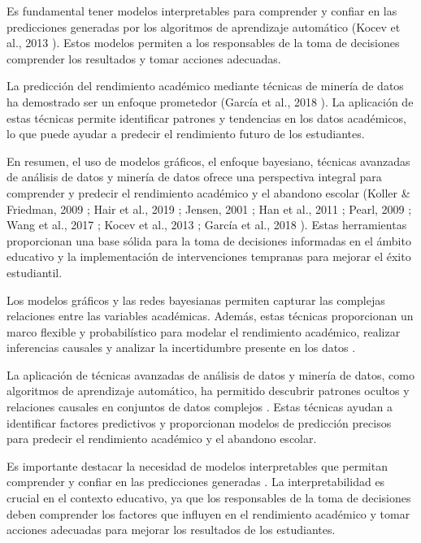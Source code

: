 Es fundamental tener modelos interpretables para comprender y confiar en las predicciones generadas por los algoritmos de aprendizaje automático
(Kocev et al., 2013 \cite{kocev2013need}). Estos modelos permiten a los responsables de la toma de decisiones comprender los resultados y tomar
acciones adecuadas.

La predicción del rendimiento académico mediante técnicas de minería de datos ha demostrado ser un enfoque prometedor
(García et al., 2018 \cite{garcia2018prediccion}). La aplicación de estas técnicas permite identificar patrones y tendencias en los datos académicos,
lo que puede ayudar a predecir el rendimiento futuro de los estudiantes.

En resumen, el uso de modelos gráficos, el enfoque bayesiano, técnicas avanzadas de análisis de datos y minería de datos ofrece una perspectiva integral para
comprender y predecir el rendimiento académico y el abandono escolar (Koller \& Friedman, 2009 \cite{koller2009introduction};
Hair et al., 2019 \cite{hair2019advanced}; Jensen, 2001 \cite{jensen2001bayesian}; Han et al., 2011 \cite{han2011data}; Pearl, 2009 \cite{pearl2009introduction};
Wang et al., 2017 \cite{wang2017literature}; Kocev et al., 2013 \cite{kocev2013need}; García et al., 2018 \cite{garcia2018prediccion}).
Estas herramientas proporcionan una base sólida para la toma de decisiones informadas en el ámbito educativo y la implementación de intervenciones tempranas
para mejorar el éxito estudiantil.

Los modelos gráficos y las redes bayesianas permiten capturar las complejas relaciones entre las variables académicas. Además, 
estas técnicas proporcionan un marco flexible y probabilístico para modelar el rendimiento académico, realizar inferencias causales y 
analizar la incertidumbre presente en los datos \cite{jensen2001bayesian}.

La aplicación de técnicas avanzadas de análisis de datos y minería de datos, como algoritmos de aprendizaje automático, ha permitido descubrir patrones ocultos
y relaciones causales en conjuntos de datos complejos \cite{hair2019advanced, han2011data}. Estas técnicas ayudan a identificar factores predictivos y
proporcionan modelos de predicción precisos para predecir el rendimiento académico y el abandono escolar.

Es importante destacar la necesidad de modelos interpretables que permitan comprender y confiar en las predicciones generadas \cite{kocev2013need}.
La interpretabilidad es crucial en el contexto educativo, ya que los responsables de la toma de decisiones deben comprender los factores que influyen
en el rendimiento académico y tomar acciones adecuadas para mejorar los resultados de los estudiantes.

